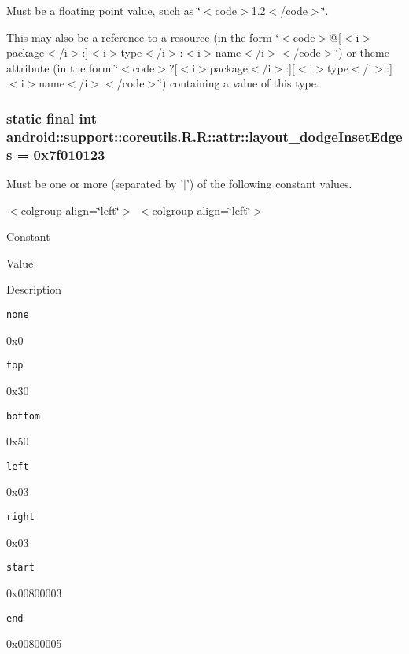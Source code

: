 Must be a floating point value, such as \char`\"{}$<$code$>$1.2$<$/code$>$\char`\"{}. 

This may also be a reference to a resource (in the form \char`\"{}$<$code$>$@\mbox{[}$<$i$>$package$<$/i$>$:\mbox{]}$<$i$>$type$<$/i$>$:$<$i$>$name$<$/i$>$$<$/code$>$\char`\"{}) or theme attribute (in the form \char`\"{}$<$code$>$?\mbox{[}$<$i$>$package$<$/i$>$:\mbox{]}\mbox{[}$<$i$>$type$<$/i$>$:\mbox{]}$<$i$>$name$<$/i$>$$<$/code$>$\char`\"{}) containing a value of this type. \hypertarget{classandroid_1_1support_1_1coreutils_1_1_r_1_1attr_a7d8b08c712ae3f111e52bfa6446a6fc}{
\subsubsection[{layout\_\-dodgeInsetEdges}]{\setlength{\rightskip}{0pt plus 5cm}static final int android::support::coreutils.R.R::attr::layout\_\-dodgeInsetEdges = 0x7f010123}}
\label{classandroid_1_1support_1_1coreutils_1_1_r_1_1attr_a7d8b08c712ae3f111e52bfa6446a6fc}


Must be one or more (separated by '$|$') of the following constant values. \begin{TabularC}{0}
\hline
\end{TabularC}
$<$colgroup align=\char`\"{}left\char`\"{}$>$ $<$colgroup align=\char`\"{}left\char`\"{}$>$ 

Constant

Value

Description 

{\tt none}

0x0

{\tt top}

0x30

{\tt bottom}

0x50

{\tt left}

0x03

{\tt right}

0x03

{\tt start}

0x00800003

{\tt end}

0x00800005

